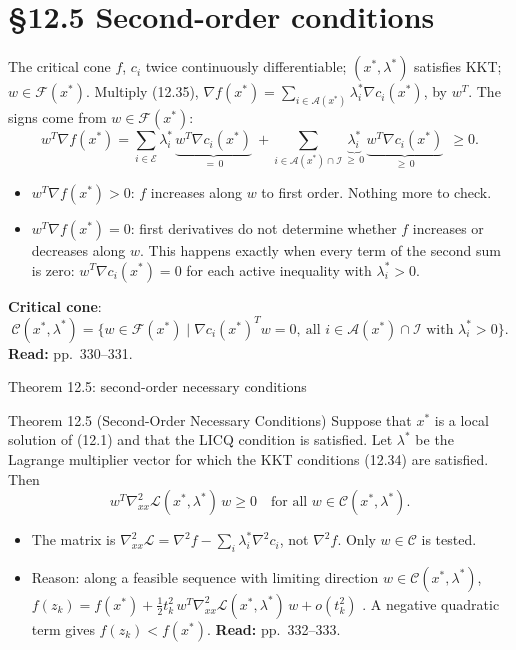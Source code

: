\documentclass[aspectratio=169,12pt]{beamer}
\newcommand{\xs}{x^{*}}
\newcommand{\gradf}{\nabla f}
\newcommand{\hessf}{\nabla^{2} f}
\newcommand{\eqn}[1]{\text{\small(#1)}}
\newcommand{\readbook}[1]{{\color{red}\textbf{Read:} #1}}
\newcommand{\ls}{\lambda^{*}}
\newcommand{\cA}{\mathcal{A}}
\newcommand{\cC}{\mathcal{C}}
\newcommand{\cE}{\mathcal{E}}
\newcommand{\cF}{\mathcal{F}}
\newcommand{\cI}{\mathcal{I}}
\newcommand{\cL}{\mathcal{L}}
\newcommand{\hessL}{\nabla_{xx}^{2}\cL}
\begin{document}
\section{\S12.5 Second-order conditions}

\begin{frame}{The critical cone}
  $f$, $c_{i}$ twice continuously differentiable; $(\xs,\ls)$ satisfies KKT; $w\in\cF(\xs)$.
  Multiply (12.35), $\gradf(\xs)=\sum_{i\in\cA(\xs)}\ls_{i}\nabla c_{i}(\xs)$, by $w^{T}$. The signs come from $w\in\cF(\xs)$:
  \[ w^{T}\gradf(\xs)=\sum_{i\in\cE}\ls_{i}\,\underbrace{w^{T}\nabla c_{i}(\xs)}_{=\,0}
     \ +\sum_{i\in\cA(\xs)\cap\cI}\underbrace{\ls_{i}}_{\ge\,0}\,\underbrace{w^{T}\nabla c_{i}(\xs)}_{\ge\,0}\ \ \ge 0 . \]
  \begin{itemize}\setlength\itemsep{0.4em}
    \item $w^{T}\gradf(\xs)>0$: $f$ increases along $w$ to first order. Nothing more to check.
    \item $w^{T}\gradf(\xs)=0$: first derivatives do not determine whether $f$ increases or decreases
      along $w$. This happens exactly when every term of the second sum is zero:
      $w^{T}\nabla c_{i}(\xs)=0$ for each active inequality with $\ls_{i}>0$.
  \end{itemize}
  \textbf{Critical cone}:
  \[ \cC(\xs,\ls)=\{w\in\cF(\xs)\mid\nabla c_{i}(\xs)^{T}w=0,\ \text{all } i\in\cA(\xs)\cap\cI \text{ with } \ls_{i}>0\} . \]
  \readbook{pp.~330--331.}
\end{frame}

\begin{frame}{Theorem 12.5: second-order necessary conditions}
  \begin{block}{Theorem 12.5 (Second-Order Necessary Conditions)}
    Suppose that $\xs$ is a local solution of (12.1) and that the LICQ condition is satisfied. Let $\ls$
    be the Lagrange multiplier vector for which the KKT conditions (12.34) are satisfied. Then
    \[ w^{T}\hessL(\xs,\ls)\,w\ge 0\quad\text{for all } w\in\cC(\xs,\ls) . \tag{12.57} \]
  \end{block}
  \begin{itemize}\setlength\itemsep{0.3em}
    \item The matrix is $\hessL=\hessf-\sum_{i}\ls_{i}\nabla^{2}c_{i}$, not $\hessf$.
      Only $w\in\cC$ is tested.
    \item Reason: along a feasible sequence with limiting direction $w\in\cC(\xs,\ls)$,
      $f(z_{k})=f(\xs)+\tfrac12 t_{k}^{2}\,w^{T}\hessL(\xs,\ls)\,w+o(t_{k}^{2})$ \eqn{12.64}. A negative
      quadratic term gives $f(z_{k})<f(\xs)$. \readbook{pp.~332--333.}
  \end{itemize}
\end{frame}
\end{document}
